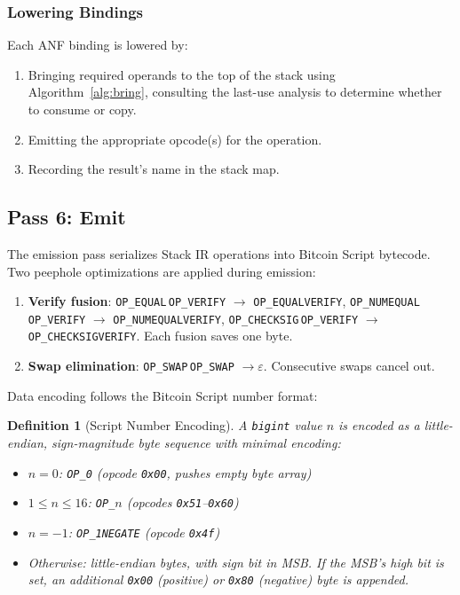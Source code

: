 \documentclass[11pt,a4paper]{article}
\newtheorem{definition}[theorem]{Definition}
\newcommand{\op}[1]{\texttt{OP\_#1}}
\newcommand{\bigintty}{\texttt{bigint}}
\begin{document}
\subsubsection{Lowering Bindings}

Each ANF binding is lowered by:
\begin{enumerate}[nosep]
  \item Bringing required operands to the top of the stack using
    Algorithm~\ref{alg:bring}, consulting the last-use analysis to
    determine whether to consume or copy.
  \item Emitting the appropriate opcode(s) for the operation.
  \item Recording the result's name in the stack map.
\end{enumerate}

\subsection{Pass 6: Emit}
\label{sec:pass-emit}

The emission pass serializes Stack IR operations into Bitcoin Script bytecode.
Two peephole optimizations are applied during emission:

\begin{enumerate}[nosep]
  \item \textbf{Verify fusion}: \op{EQUAL}\,\op{VERIFY} $\to$
    \op{EQUALVERIFY}, \op{NUMEQUAL}\,\op{VERIFY} $\to$
    \op{NUMEQUALVERIFY}, \op{CHECKSIG}\,\op{VERIFY} $\to$
    \op{CHECKSIGVERIFY}. Each fusion saves one byte.
  \item \textbf{Swap elimination}: \op{SWAP}\,\op{SWAP} $\to \varepsilon$.
    Consecutive swaps cancel out.
\end{enumerate}

Data encoding follows the Bitcoin Script number format:

\begin{definition}[Script Number Encoding]
A \bigintty{} value $n$ is encoded as a little-endian, sign-magnitude
byte sequence with minimal encoding:
\begin{itemize}[nosep]
  \item $n = 0$: \op{0} (opcode \texttt{0x00}, pushes empty byte array)
  \item $1 \leq n \leq 16$: \op{$n$} (opcodes \texttt{0x51}--\texttt{0x60})
  \item $n = -1$: \op{1NEGATE} (opcode \texttt{0x4f})
  \item Otherwise: little-endian bytes, with sign bit in MSB. If the MSB's
    high bit is set, an additional \texttt{0x00} (positive) or \texttt{0x80}
    (negative) byte is appended.
\end{itemize}
\end{definition}
\end{document}
